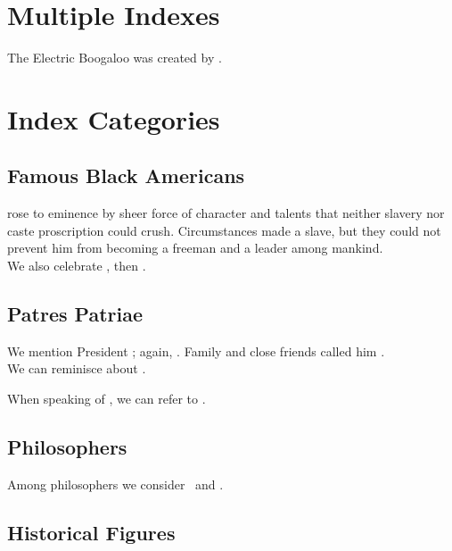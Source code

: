 \documentclass[oneside]{article}
\begin{document}
%
%

\section{Multiple Indexes}

The Electric Boogaloo %
was created by .           %

%
%

\section{Index Categories}

\subsection{Famous Black Americans}

 rose to eminence by sheer force of
character and talents that neither slavery nor caste
proscription could crush. Circumstances made
 a slave, but they could not prevent
him from becoming a freeman and a leader among mankind.\\

We also celebrate \MLK, then \MLK.

\subsection{Patres Patriae}

We mention President \Wash; again, \Wash.
Family and close friends called him \SWash.\\

We can reminisce about \LWash[General].

When speaking of \Linc, we can refer to \LLinc[Abe].

\subsection{Philosophers}

Among philosophers we consider \Plato\ and \Aris.

\subsection{Historical Figures}
\end{document}
